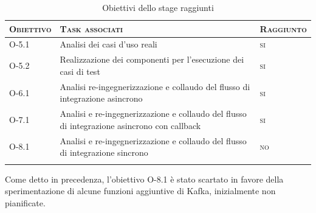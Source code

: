 \onehalfspacing
\begin{small}
  \begin{center}
    \centering
    \renewcommand\arraystretch{1.6}
    \begin{longtable}{| >{\centering\arraybackslash}m{2cm}|m{9.5cm}|>{\centering\arraybackslash}m{2.2cm}|}
      \hline
      \textsc{\textbf{Obiettivo}} & \textsc{\textbf{Task associati}} & \textsc{\textbf{Raggiunto}} \\
      \hline
      O-5.1 & Analisi dei casi d'uso reali & \textsc{si} \\
      \hline
      O-5.2 & Realizzazione dei componenti per l'esecuzione dei casi di test & \textsc{si}\\
      \Xhline{2\arrayrulewidth}
      O-6.1 & Analisi re-ingegnerizzazione e collaudo del flusso di integrazione asincrono & \textsc{si} \\
      \Xhline{2\arrayrulewidth}
      O-7.1 & Analisi e re-ingegnerizzazione e collaudo del flusso di integrazione asincrono con callback & \textsc{si}\\
      \Xhline{2\arrayrulewidth}
      O-8.1 & Analisi e re-ingegnerizzazione e collaudo del flusso di integrazione sincrono & \textsc{no}\\
      \hline

      \caption{Obiettivi dello stage raggiunti}
    \end{longtable}
  \end{center}
\end{small}

Come detto in precedenza, l'obiettivo O-8.1 è stato scartato in favore della sperimentazione di alcune funzioni aggiuntive di Kafka, inizialmente non pianificate.

%
%

